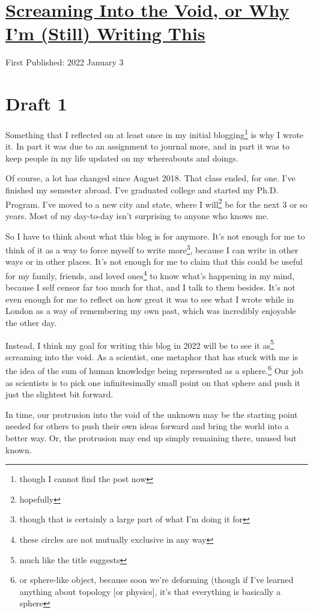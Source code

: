 \documentclass[12pt]{article}[titlepage]
\newcommand{\1}{\={a}}
\newcommand{\2}{\={e}}
\newcommand{\3}{\={\i}}
\newcommand{\4}{\=o}
\newcommand{\5}{\=u}
\newcommand{\6}{\={A}}
\renewcommand{\,}{\textsuperscript{,}}
\begin{document}
\doublespacing
\section{\href{screaming-into-void.html}{Screaming Into the Void, or Why I'm (Still) Writing This}}
First Published: 2022 January 3
\section{Draft 1}
Something that I reflected on at least once in my initial blogging\footnote{though I cannot find the post now} is why I wrote it.
In part it was due to an assignment to journal more, and in part it was to keep people in my life updated on my whereabouts and doings.

Of course, a lot has changed since August 2018.
That class ended, for one.
I've finished my semester abroad.
I've graduated college and started my Ph.D. Program.
I've moved to a new city and state, where I will\footnote{hopefully} be for the next 3 or so years.
Most of my day-to-day isn't surprising to anyone who knows me.

So I have to think about what this blog is for anymore.
It's not enough for me to think of it as a way to force myself to write more\footnote{though that is certainly a large part of what I'm doing it for}, because I can write in other ways or in other places.
It's not enough for me to claim that this could be useful for my family, friends, and loved ones\footnote{these circles are not mutually exclusive in any way} to know what's happening in my mind, because I self censor far too much for that, and I talk to them besides.
It's not even enough for me to reflect on how great it was to see what I wrote while in London as a way of remembering my own past, which was incredibly enjoyable the other day.

Instead, I think my goal for writing this blog in 2022 will be to see it as\footnote{much like the title suggests} screaming into the void.
As a scientist, one metaphor that has stuck with me is the idea of the sum of human knowledge being represented as a sphere.\footnote{or sphere-like object, because soon we're deforming (though if I've learned anything about topology [or physics], it's that everything is basically a sphere}
Our job as scientists is to pick one infinitesimally small point on that sphere and push it just the slightest bit forward.

In time, our protrusion into the void of the unknown may be the starting point needed for others to push their own ideas forward and bring the world into a better way.
Or, the protrusion may end up simply remaining there, unused but known.
\end{document}
